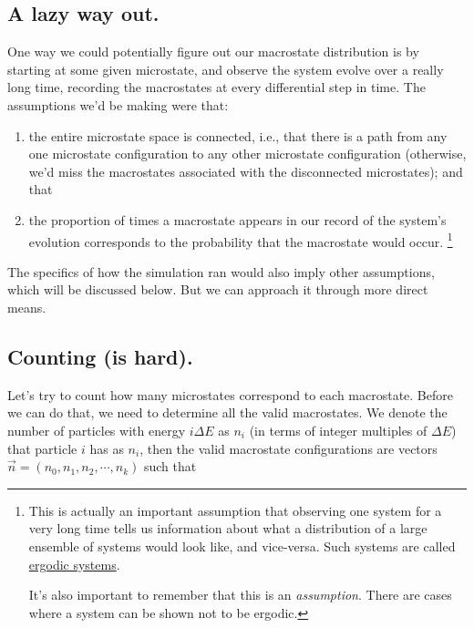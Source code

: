 \documentclass[letterpaper,12pt]{report}
\providecommand{\tightlist}{%
  \setlength{\itemsep}{0pt}\setlength{\parskip}{0pt}}
\begin{document}
\subsection{A lazy way out.}
One way we could potentially figure out our macrostate distribution
is by starting at some given
microstate, and observe the system evolve over a really long time, recording the macrostates
at every differential step in time. The assumptions we'd be making were that:
\begin{enumerate}
  \tightlist
  \item
    the entire 
    microstate space is connected, i.e., 
    that there is a path from any one microstate configuration
    to any other microstate configuration (otherwise, we'd miss the macrostates
    associated with the disconnected microstates); and that
  \item
    the proportion of times a macrostate appears in our record of the system's evolution
    corresponds to the probability that the macrostate would occur. \footnote{
      This is actually an important assumption \textemdash{} that observing one system for
      a very long time tells us information about what a distribution of a large ensemble
      of systems would look like, and vice-versa.
      Such systems are called \href{https://en.wikipedia.org/wiki/Ergodicity}{ergodic systems}.

      It's also important to remember that this is an \emph{assumption}. There are cases
      where a system can be shown not to be ergodic.
    }
\end{enumerate}
The specifics of how the simulation ran would also imply other assumptions, which will
be discussed below. But we can approach it through
more direct means.

\subsection{Counting (is hard).}\label{subsec:counting-is-hard}

Let's try to count how many microstates correspond to each macrostate. Before we can
do that, we need to determine all the valid macrostates.
We denote the number of particles with energy \(i\Delta E\) as \(n_i\) 
(in terms of integer multiples of \(\Delta E\)) that particle \(i\)
has as \(n_i\), then the valid macrostate configurations are
vectors \(\vec{n} = (n_0, n_1, n_2, \cdots, n_k)\) such that %
\end{document}
